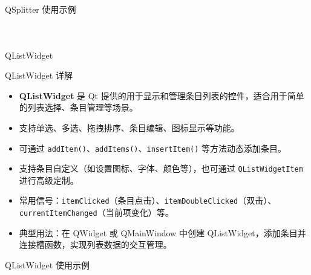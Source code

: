 \documentclass[UTF8,aspectratio=169]{beamer}
\begin{document}
\begin{frame}[fragile]{QSplitter 使用示例}
    \begin{columns}
        \begin{column}{0.48\textwidth}
            \inputminted[firstline=1,lastline=15]{cpp}{code/qt_splitter_example.cpp}
        \end{column}
        \begin{column}{0.48\textwidth}
            \inputminted[firstline=16,lastline=31]{cpp}{code/qt_splitter_example.cpp}
        \end{column}
    \end{columns}
\end{frame}

\begin{frame}{QListWidget}
    \begin{ytublock}{QListWidget 详解}
        \begin{itemize}
            \item \textbf{QListWidget} 是 Qt 提供的用于显示和管理条目列表的控件，适合用于简单的列表选择、条目管理等场景。
            \item 支持单选、多选、拖拽排序、条目编辑、图标显示等功能。
            \item 可通过 \texttt{addItem()}、\texttt{addItems()}、\texttt{insertItem()} 等方法动态添加条目。
            \item 支持条目自定义（如设置图标、字体、颜色等），也可通过 \texttt{QListWidgetItem} 进行高级定制。
            \item 常用信号：\texttt{itemClicked}（条目点击）、\texttt{itemDoubleClicked}（双击）、\texttt{currentItemChanged}（当前项变化）等。
            \item 典型用法：在 QWidget 或 QMainWindow 中创建 QListWidget，添加条目并连接槽函数，实现列表数据的交互管理。
        \end{itemize}
    \end{ytublock}
\end{frame}

\begin{frame}[fragile]{QListWidget 使用示例}
    \begin{columns}
        \begin{column}{0.48\textwidth}
            \inputminted[firstline=1,lastline=15]{cpp}{code/qt_listwidget_example.cpp}
        \end{column}
        \begin{column}{0.48\textwidth}
            \inputminted[firstline=16,lastline=30]{cpp}{code/qt_listwidget_example.cpp}
        \end{column}
    \end{columns}
\end{frame}
\end{document}
